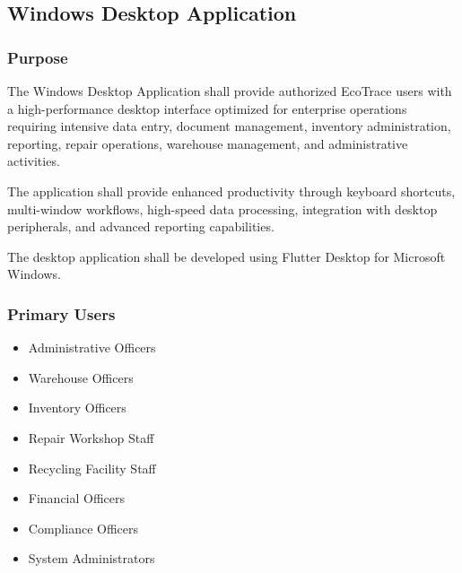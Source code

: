 \subsection{Windows Desktop Application}

\subsubsection*{Purpose}

The Windows Desktop Application shall provide authorized EcoTrace users
with a high-performance desktop interface optimized for enterprise
operations requiring intensive data entry, document management,
inventory administration, reporting, repair operations, warehouse
management, and administrative activities.

The application shall provide enhanced productivity through keyboard
shortcuts, multi-window workflows, high-speed data processing,
integration with desktop peripherals, and advanced reporting
capabilities.

The desktop application shall be developed using Flutter Desktop for
Microsoft Windows.


\subsubsection*{Primary Users}

\begin{itemize}

\item Administrative Officers

\item Warehouse Officers

\item Inventory Officers

\item Repair Workshop Staff

\item Recycling Facility Staff

\item Financial Officers

\item Compliance Officers

\item System Administrators

\end{itemize}

